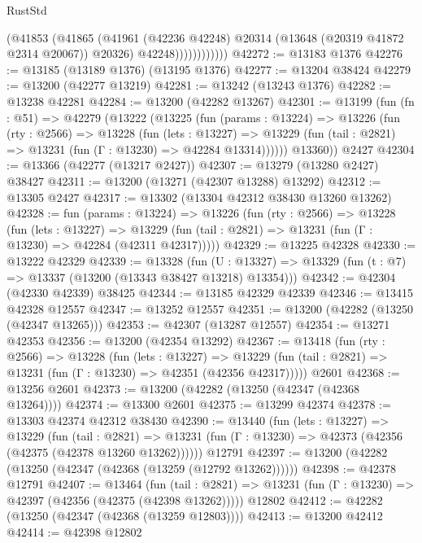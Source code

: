 \begin{lexlean}{RustStd}
\begin{coremodule}
                        (@41853
                          (@41865
                            (@41961
                              (@42236 @42248)
                              @20314
                              (@13648 (@20319 @41872 @2314 @20067))
                              @20326)
                            @42248))))))))))))
@42272 := @13183 @1376
@42276 := @13185 (@13189 @1376) (@13195 @1376)
@42277 := @13204 @38424
@42279 := @13200 (@42277 @13219)
@42281 := @13242 (@13243 @1376)
@42282 := @13238 @42281
@42284 := @13200 (@42282 @13267)
@42301 := @13199
    (fun (fn : @51) =>
    @42279
      (@13222
        (@13225
          (fun (params : @13224) =>
          @13226
            (fun (rty : @2566) =>
            @13228
              (fun (lets : @13227) =>
              @13229 (fun (tail : @2821) => @13231 (fun (Γ : @13230) => @42284 @13314))))))
        @13360))
    @2427
@42304 := @13366 (@42277 (@13217 @2427))
@42307 := @13279 (@13280 @2427) @38427
@42311 := @13200 (@13271 (@42307 @13288) @13292)
@42312 := @13305 @2427
@42317 := @13302 (@13304 @42312 @38430 @13260 @13262)
@42328 := fun (params : @13224) =>
  @13226
    (fun (rty : @2566) =>
    @13228
      (fun (lets : @13227) =>
      @13229 (fun (tail : @2821) => @13231 (fun (Γ : @13230) => @42284 (@42311 @42317)))))
@42329 := @13225 @42328
@42330 := @13222 @42329
@42339 := @13328
    (fun (U : @13327) => @13329 (fun (t : @7) => @13337 (@13200 (@13343 @38427 @13218) @13354)))
@42342 := @42304 (@42330 @42339) @38425
@42344 := @13185 @42329 @42339
@42346 := @13415 @42328 @12557
@42347 := @13252 @12557
@42351 := @13200 (@42282 (@13250 (@42347 @13265)))
@42353 := @42307 (@13287 @12557)
@42354 := @13271 @42353
@42356 := @13200 (@42354 @13292)
@42367 := @13418
    (fun (rty : @2566) =>
    @13228
      (fun (lets : @13227) =>
      @13229 (fun (tail : @2821) => @13231 (fun (Γ : @13230) => @42351 (@42356 @42317)))))
    @2601
@42368 := @13256 @2601
@42373 := @13200 (@42282 (@13250 (@42347 (@42368 @13264))))
@42374 := @13300 @2601
@42375 := @13299 @42374
@42378 := @13303 @42374 @42312 @38430
@42390 := @13440
    (fun (lets : @13227) =>
    @13229
      (fun (tail : @2821) =>
      @13231 (fun (Γ : @13230) => @42373 (@42356 (@42375 (@42378 @13260 @13262))))))
    @12791
@42397 := @13200 (@42282 (@13250 (@42347 (@42368 (@13259 (@12792 @13262))))))
@42398 := @42378 @12791
@42407 := @13464
    (fun (tail : @2821) => @13231 (fun (Γ : @13230) => @42397 (@42356 (@42375 (@42398 @13262)))))
    @12802
@42412 := @42282 (@13250 (@42347 (@42368 (@13259 @12803))))
@42413 := @13200 @42412
@42414 := @42398 @12802

\end{coremodule}
\end{lexlean}
